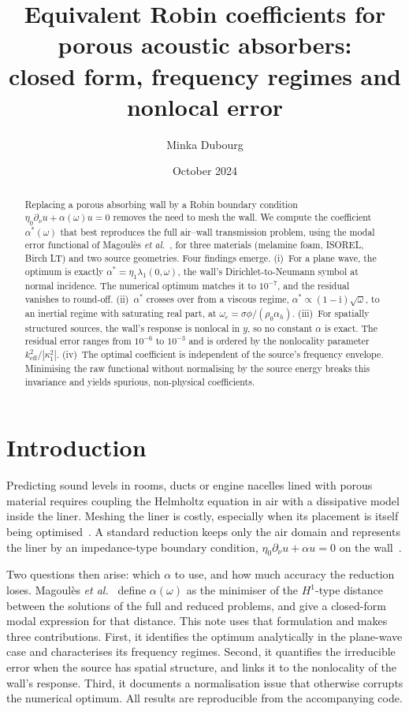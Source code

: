 \documentclass[10pt,a4paper]{article}
\title{\textbf{Equivalent Robin coefficients for porous acoustic absorbers:\\closed form, frequency regimes and nonlocal error}}
\author{Minka Dubourg}
\date{October 2024}
\newcommand{\ii}{\mathrm{i}}
\begin{document}
\maketitle

\begin{abstract}
\noindent
Replacing a porous absorbing wall by a Robin boundary condition $\eta_0\partial_\nu u+\alpha(\omega)u=0$ removes the need to mesh the wall. We compute the coefficient $\alpha^*(\omega)$ that best reproduces the full air--wall transmission problem, using the modal error functional of Magoulès \textit{et al.}~\cite{magoules2021}, for three materials (melamine foam, ISOREL, Birch LT) and two source geometries. Four findings emerge.
(i)~For a plane wave, the optimum is exactly $\alpha^*=\eta_1\lambda_1(0,\omega)$, the wall's Dirichlet-to-Neumann symbol at normal incidence. The numerical optimum matches it to $10^{-7}$, and the residual vanishes to round-off.
(ii)~$\alpha^*$ crosses over from a viscous regime, $\alpha^*\propto(1-\ii)\sqrt{\omega}$, to an inertial regime with saturating real part, at $\omega_c=\sigma\phi/(\rho_0\alpha_h)$.
(iii)~For spatially structured sources, the wall's response is nonlocal in $y$, so no constant $\alpha$ is exact. The residual error ranges from $10^{-6}$ to $10^{-3}$ and is ordered by the nonlocality parameter $k_\mathrm{eff}^2/|\kappa_1^2|$.
(iv)~The optimal coefficient is independent of the source's frequency envelope. Minimising the raw functional without normalising by the source energy breaks this invariance and yields spurious, non-physical coefficients.
\end{abstract}

\section{Introduction}
Predicting sound levels in rooms, ducts or engine nacelles lined with porous material requires coupling the Helmholtz equation in air with a dissipative model inside the liner. Meshing the liner is costly, especially when its placement is itself being optimised~\cite{magoules2024}. A standard reduction keeps only the air domain and represents the liner by an impedance-type boundary condition, $\eta_0\partial_\nu u+\alpha u=0$ on the wall~\cite{allard2009}.

Two questions then arise: which $\alpha$ to use, and how much accuracy the reduction loses. Magoulès \textit{et al.}~\cite{magoules2021} define $\alpha(\omega)$ as the minimiser of the $H^1$-type distance between the solutions of the full and reduced problems, and give a closed-form modal expression for that distance. This note uses that formulation and makes three contributions. First, it identifies the optimum analytically in the plane-wave case and characterises its frequency regimes. Second, it quantifies the irreducible error when the source has spatial structure, and links it to the nonlocality of the wall's response. Third, it documents a normalisation issue that otherwise corrupts the numerical optimum. All results are reproducible from the accompanying code.
\end{document}
